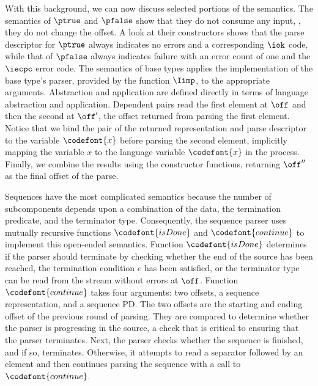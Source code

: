 With this background, we can now discuss selected portions of the semantics.
The semantics of $\ptrue$ and $\pfalse$ show that they do not consume any input, \ie{}, they do not change the offset. 
A look at their constructors shows that the parse
descriptor for $\ptrue$ always indicates no errors and a corresponding
$\iok$ code, while that of $\pfalse$ always indicates failure with an
error count of one and the $\iecpc$ error code. The semantics of base
types applies the implementation of the base type's parser, provided
by the function $\Iimp$, to the appropriate arguments.  Abstraction
and application are defined directly in terms of \implang language
abstraction and application.  Dependent pairs read the first element
at $\off$ and then the second at $\off'$, the offset returned from
parsing the first element.  Notice that we bind the pair of the
returned representation and parse descriptor to the variable $\codefont{x}$
before parsing the second element, implicitly mapping the 
\ddc{} variable $x$ to the \implang{} language variable $\codefont{x}$ in the process.
Finally, we combine the results
using the constructor functions, returning $\off''$ as the final
offset of the parse.

Sequences have the most complicated semantics because the number of subcomponents depends upon a combination of the data, the termination predicate, and the terminator type. Consequently, the sequence parser uses mutually
recursive functions $\codefont{isDone}$ and $\codefont{continue}$ to implement this open-ended semantics. 
Function $\codefont{isDone}$ determines if the parser
should terminate by checking whether the end of the source has been
reached, the termination condition $e$ has been satisfied, or the
terminator type can be read from the stream without errors at
$\off$.
Function $\codefont{continue}$ takes four
arguments: two offsets, a sequence representation, and a sequence PD.  The two
offsets are the starting and ending offset of the previous round of
parsing. They are compared to determine whether the parser is
progressing in the source, a check that is critical to ensuring that
the parser terminates. Next, the parser checks whether the sequence is
finished, and if so, terminates. Otherwise, it attempts to read a
separator followed by an element and then continues parsing the
sequence with a call to $\codefont{continue}$.

